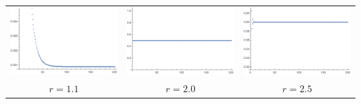\documentclass{hw}
\begin{document}
\begin{enumerate}
{\centering
\begin{tabular}{c c c}
\includegraphics[scale=0.4]{p11}&
\includegraphics[scale=0.4]{p20}&
\includegraphics[scale=0.4]{p25}\\
$r=1.1$ & $r=2.0$ & $r=2.5$
\end{tabular}

}
\end{enumerate}
\end{document}
